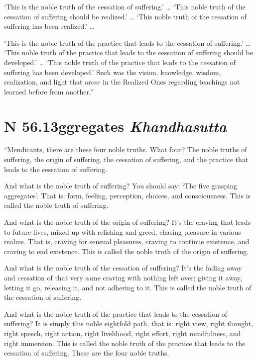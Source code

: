 \documentclass[12pt,openany]{book}%
\newcommand*{\suttatitleacronym}[1]{\smaller[2]{#1}\vspace*{.3em}}
\newcommand*{\suttatitletranslation}[1]{\linebreak{#1}}
\newcommand*{\suttatitleroot}[1]{\linebreak\smaller[2]\itshape{#1}}
\newcommand*{\tocacronym}[1]{\hspace*{-3.3em}{#1}\quad}
\newcommand*{\toctranslation}[1]{#1}
\newcommand*{\tocroot}[1]{(\textit{#1})}
\begin{document}
‘This is the noble truth of the cessation of suffering.’ … ‘This noble truth of the cessation of suffering should be realized.’ … ‘This noble truth of the cessation of suffering has been realized.’ … 

‘This is the noble truth of the practice that leads to the cessation of suffering.’ … ‘This noble truth of the practice that leads to the cessation of suffering should be developed.’ … ‘This noble truth of the practice that leads to the cessation of suffering has been developed.’ Such was the vision, knowledge, wisdom, realization, and light that arose in the Realized Ones regarding teachings not learned before from another.” 

%
\section*{{\suttatitleacronym SN 56.13}{\suttatitletranslation Aggregates }{\suttatitleroot Khandhasutta}}
\addcontentsline{toc}{section}{\tocacronym{SN 56.13} \toctranslation{Aggregates } \tocroot{Khandhasutta}}

“Mendicants, there are these four noble truths. What four? The noble truths of suffering, the origin of suffering, the cessation of suffering, and the practice that leads to the cessation of suffering. 

And what is the noble truth of suffering? You should say: ‘The five grasping aggregates’. That is: form, feeling, perception, choices, and consciousness. This is called the noble truth of suffering. 

And what is the noble truth of the origin of suffering? It’s the craving that leads to future lives, mixed up with relishing and greed, chasing pleasure in various realms. That is, craving for sensual pleasures, craving to continue existence, and craving to end existence. This is called the noble truth of the origin of suffering. 

And what is the noble truth of the cessation of suffering? It’s the fading away and cessation of that very same craving with nothing left over; giving it away, letting it go, releasing it, and not adhering to it. This is called the noble truth of the cessation of suffering. 

And what is the noble truth of the practice that leads to the cessation of suffering? It is simply this noble eightfold path, that is: right view, right thought, right speech, right action, right livelihood, right effort, right mindfulness, and right immersion. This is called the noble truth of the practice that leads to the cessation of suffering. These are the four noble truths. 
\end{document}
